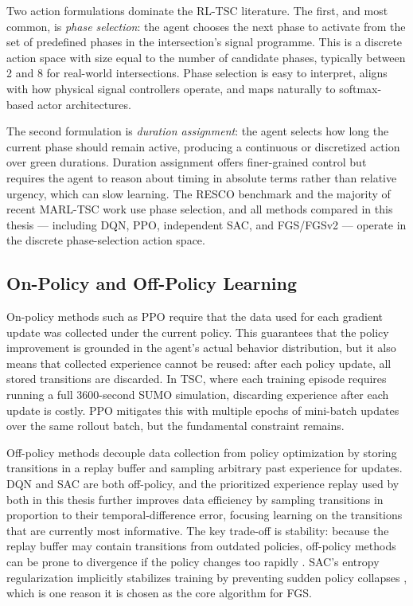 Two action formulations dominate the RL-TSC literature. The first, and most common, is \emph{phase selection}: the agent chooses the next phase to activate from the set of predefined phases in the intersection's signal programme. This is a discrete action space with size equal to the number of candidate phases, typically between 2 and 8 for real-world intersections. Phase selection is easy to interpret, aligns with how physical signal controllers operate, and maps naturally to softmax-based actor architectures.

The second formulation is \emph{duration assignment}: the agent selects how long the current phase should remain active, producing a continuous or discretized action over green durations. Duration assignment offers finer-grained control but requires the agent to reason about timing in absolute terms rather than relative urgency, which can slow learning. The RESCO benchmark and the majority of recent MARL-TSC work use phase selection, and all methods compared in this thesis — including DQN, PPO, independent SAC, and FGS/FGSv2 — operate in the discrete phase-selection action space.

\subsection{On-Policy and Off-Policy Learning}
\label{sec:LiteratureReview_OnPolicyOffPolicy}

On-policy methods such as PPO \citep{schulman2017proximal} require that the data used for each gradient update was collected under the current policy. This guarantees that the policy improvement is grounded in the agent's actual behavior distribution, but it also means that collected experience cannot be reused: after each policy update, all stored transitions are discarded. In TSC, where each training episode requires running a full 3600-second SUMO simulation, discarding experience after each update is costly. PPO mitigates this with multiple epochs of mini-batch updates over the same rollout batch, but the fundamental constraint remains.

Off-policy methods decouple data collection from policy optimization by storing transitions in a replay buffer and sampling arbitrary past experience for updates. DQN and SAC are both off-policy, and the prioritized experience replay \citep{schaul2016prioritized} used by both in this thesis further improves data efficiency by sampling transitions in proportion to their temporal-difference error, focusing learning on the transitions that are currently most informative. The key trade-off is stability: because the replay buffer may contain transitions from outdated policies, off-policy methods can be prone to divergence if the policy changes too rapidly \citep{sutton2018reinforcement}. SAC's entropy regularization implicitly stabilizes training by preventing sudden policy collapses \citep{haarnoja2018soft}, which is one reason it is chosen as the core algorithm for FGS.

